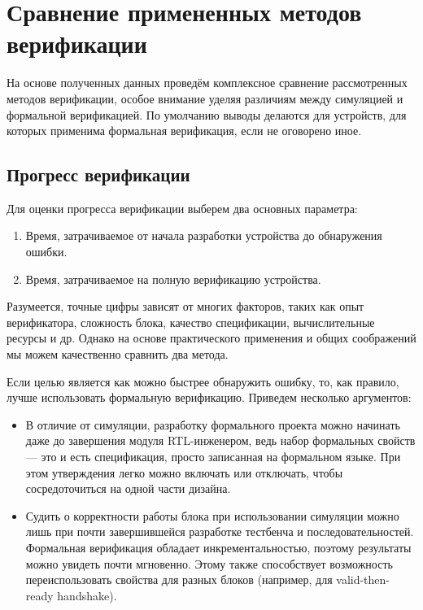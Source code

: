 \section{Сравнение примененных методов верификации}

\tab На основе полученных данных проведём комплексное сравнение рассмотренных методов верификации, особое внимание уделяя различиям между симуляцией и формальной верификацией. По умолчанию выводы делаются для устройств, для которых применима формальная верификация, если не оговорено иное. 

\subsection{Прогресс верификации}

\tab Для оценки прогресса верификации выберем два основных параметра: 

\begin{enumerate}
    \item Время, затрачиваемое от начала разработки устройства до обнаружения ошибки.
    
    \item Время, затрачиваемое на полную верификацию устройства. 
\end{enumerate}

Разумеется, точные цифры зависят от многих факторов, таких как опыт верификатора, сложность блока, качество спецификации, вычислительные ресурсы и др. Однако на основе практического применения и общих соображений мы можем качественно сравнить два метода. 

Если целью является как можно быстрее обнаружить ошибку, то, как правило, лучше использовать формальную верификацию. Приведем несколько аргументов: 

\begin{itemize}
    \item В отличие от симуляции, разработку формального проекта можно начинать даже до завершения модуля RTL-инженером, ведь набор формальных свойств --- это и есть спецификация, просто записанная на формальном языке. При этом утверждения легко можно включать или отключать, чтобы сосредоточиться на одной части дизайна. 
    \item Судить о корректности работы блока при использовании симуляции можно лишь при почти завершившейся разработке тестбенча и последовательностей. Формальная верификация обладает инкрементальностью, поэтому результаты можно увидеть почти мгновенно. Этому также способствует возможность переиспользовать свойства для разных блоков (например, для valid-then-ready handshake).
\end{itemize}

